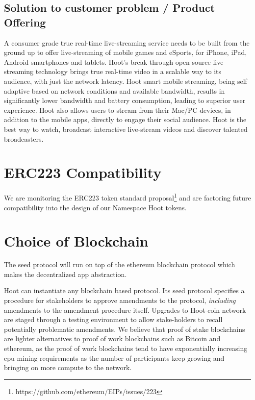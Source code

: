 \documentclass{article}
\begin{document}
\subsection{Solution to customer problem / Product Offering}
A consumer grade true real-time live-streaming service needs to be
built from the ground up to offer live-streaming of mobile games and eSports, for iPhone, iPad, Android smartphones and tablets. Hoot's break through open source live-streaming technology brings true real-time video in a scalable way to its audience, with just the network latency. Hoot smart mobile streaming, being self adaptive based on network conditions and available bandwidth, results in significantly lower bandwidth and battery consumption, leading to superior user experience. Hoot also allows users to stream from their Mac/PC devices, in addition to the mobile apps, directly to engage their social audience. Hoot is the best way to watch, broadcast interactive live-stream videos and discover talented broadcasters.

%


\section{ERC223 Compatibility}
We are monitoring the ERC223 token standard proposal\footnote{https://github.com/ethereum/EIPs/issues/223} and are factoring future compatibility into the design of our Namespace Hoot tokens.

\section{Choice of Blockchain}
The seed protocol will run on top of the ethereum blockchain protocol which makes the decentralized app abstraction. 



Hoot can instantiate any blockchain based protocol. Its seed protocol specifies a procedure for stakeholders to approve amendments to the protocol, \emph{including} amendments to the amendment procedure itself. Upgrades to Hoot-coin network are staged through a testing environment to allow stake-holders to recall potentially problematic amendments. We believe that proof of stake blockchains are lighter alternatives to proof of work blockchains such as Bitcoin and ethereum, as the proof of work blockchains tend to have exponentially increasing cpu mining requirements as the number of participants keep growing and bringing on more compute to the network.
\end{document}
